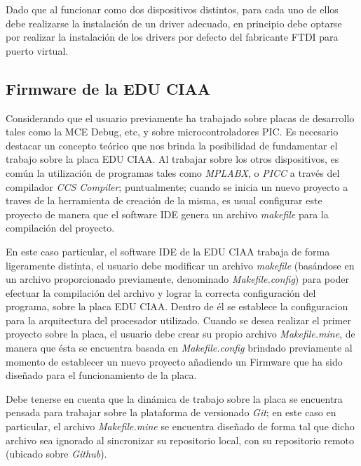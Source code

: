 \documentclass[12pt,letterpaper]{article}
\begin{document}
Dado que al funcionar como dos dispositivos distintos, para cada uno de ellos debe realizarse la instalación de un driver adecuado, en principio debe optarse por realizar la instalación de los drivers por defecto del fabricante FTDI para puerto virtual. %

\subsection{Firmware de la EDU CIAA}
Considerando que el usuario previamente ha trabajado sobre placas de desarrollo tales como la MCE Debug, etc, y sobre microcontroladores PIC. Es necesario destacar un concepto teórico que nos brinda la posibilidad de fundamentar el trabajo sobre la placa EDU CIAA. Al trabajar sobre los otros dispositivos, es común la utilización de programas tales como \textit{MPLABX}, o \textit{PICC} a través del compilador \textit{CCS Compiler}; puntualmente; cuando se inicia un nuevo proyecto a traves de la herramienta de creación de la misma, es usual configurar este proyecto de manera que el software IDE genera un archivo \textit{makefile} para la compilación del proyecto.

En este caso particular, el software IDE de la EDU CIAA trabaja de forma ligeramente distinta, el usuario debe modificar un archivo \textit{makefile} (basándose en un archivo proporcionado previamente, denominado \textit{Makefile.config}) para poder efectuar la compilación del archivo y lograr la correcta configuración del programa, sobre la placa EDU CIAA. Dentro de él se establece la configuracion para la arquitectura del procesador utilizado.
Cuando se desea realizar el primer proyecto sobre la placa, el usuario debe crear su propio archivo \textit{Makefile.mine}, de manera que ésta se encuentra basada en \textit{Makefile.config} brindado previamente al momento de establecer un nuevo proyecto añadiendo un Firmware que ha sido diseñado para el funcionamiento de la placa.

Debe tenerse en cuenta que la dinámica de trabajo sobre la placa se encuentra pensada para trabajar sobre la plataforma de versionado \textit{Git}; en este caso en particular, el archivo \textit{Makefile.mine} se encuentra diseñado de forma tal que dicho archivo sea ignorado al sincronizar su repositorio local, con su repositorio remoto (ubicado sobre \textit{Github}).
\end{document}
